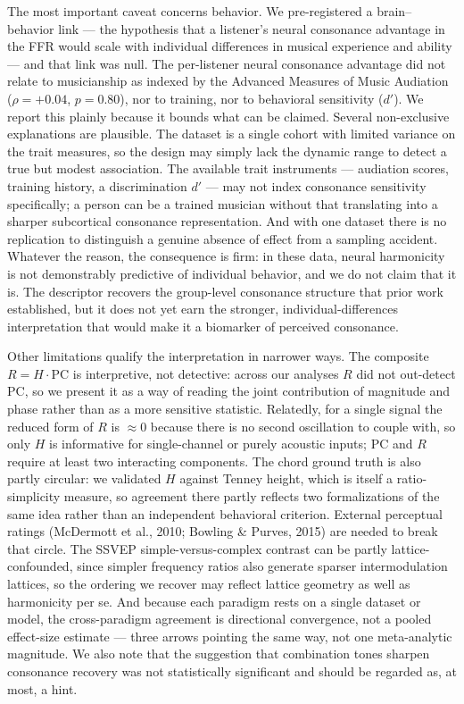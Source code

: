 \documentclass[11pt]{article}
\begin{document}
The most important caveat concerns behavior. We pre-registered a brain--behavior link --- the hypothesis that a listener's neural consonance advantage in the FFR would scale with individual differences in musical experience and ability --- and that link was null. The per-listener neural consonance advantage did not relate to musicianship as indexed by the Advanced Measures of Music Audiation ($\rho=+0.04$, $p=0.80$), nor to training, nor to behavioral sensitivity ($d'$). We report this plainly because it bounds what can be claimed. Several non-exclusive explanations are plausible. The dataset is a single cohort with limited variance on the trait measures, so the design may simply lack the dynamic range to detect a true but modest association. The available trait instruments --- audiation scores, training history, a discrimination $d'$ --- may not index consonance sensitivity specifically; a person can be a trained musician without that translating into a sharper subcortical consonance representation. And with one dataset there is no replication to distinguish a genuine absence of effect from a sampling accident. Whatever the reason, the consequence is firm: in these data, neural harmonicity is not demonstrably predictive of individual behavior, and we do not claim that it is. The descriptor recovers the group-level consonance structure that prior work established, but it does not yet earn the stronger, individual-differences interpretation that would make it a biomarker of perceived consonance.

Other limitations qualify the interpretation in narrower ways. The composite $R=H\cdot\mathrm{PC}$ is interpretive, not detective: across our analyses $R$ did not out-detect $\mathrm{PC}$, so we present it as a way of reading the joint contribution of magnitude and phase rather than as a more sensitive statistic. Relatedly, for a single signal the reduced form of $R$ is $\approx 0$ because there is no second oscillation to couple with, so only $H$ is informative for single-channel or purely acoustic inputs; $\mathrm{PC}$ and $R$ require at least two interacting components. The chord ground truth is also partly circular: we validated $H$ against Tenney height, which is itself a ratio-simplicity measure, so agreement there partly reflects two formalizations of the same idea rather than an independent behavioral criterion. External perceptual ratings (McDermott et al., 2010; Bowling \& Purves, 2015) are needed to break that circle. The SSVEP simple-versus-complex contrast can be partly lattice-confounded, since simpler frequency ratios also generate sparser intermodulation lattices, so the ordering we recover may reflect lattice geometry as well as harmonicity per se. And because each paradigm rests on a single dataset or model, the cross-paradigm agreement is directional convergence, not a pooled effect-size estimate --- three arrows pointing the same way, not one meta-analytic magnitude. We also note that the suggestion that combination tones sharpen consonance recovery was not statistically significant and should be regarded as, at most, a hint.
\end{document}

